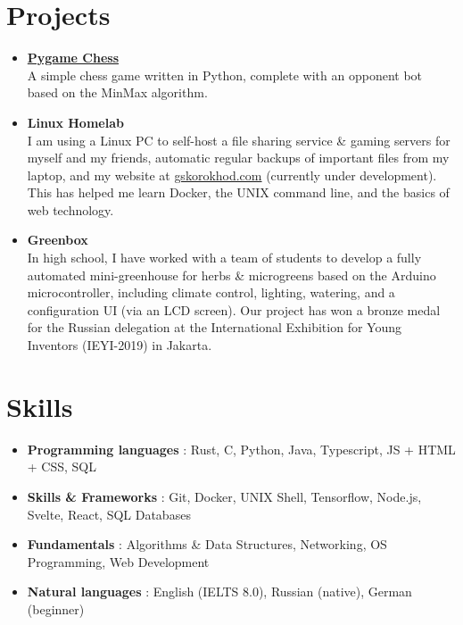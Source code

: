 \documentclass[letterpaper,11pt]{article}
\newcommand{\resumeItem}[2]{
  \item\small{
    \textbf{#1}{ #2 \vspace{-2pt}}
  }
}
\newcommand{\resumeSubItem}[2]{\resumeItem{#1}{#2}\vspace{-4pt}}
\newcommand{\resumeSubHeadingListStart}{\begin{itemize}[leftmargin=*]}
\newcommand{\resumeSubHeadingListEnd}{\end{itemize}}
\begin{document}
\section{Projects}
  \resumeSubHeadingListStart
    \resumeSubItem{\href{https://github.com/gskorokhod/PygameChess}{Pygame Chess} \\}
      {A simple chess game written in Python, complete with an opponent bot based on the MinMax algorithm.}
    \resumeSubItem{Linux Homelab \\}
      {I am using a Linux PC to self-host a file sharing service \& gaming servers for myself and my friends, automatic regular backups of important files from my laptop, and my website at \href{https://gskorokhod.com}{gskorokhod.com} (currently under development).\\ This has helped me learn Docker, the UNIX command line, and the basics of web technology. }
    \resumeSubItem{Greenbox \\}
      {In high school, I have worked with a team of students to develop a fully automated mini-greenhouse for herbs \& microgreens based on the Arduino microcontroller, including climate control, lighting, watering, and a configuration UI (via an LCD screen). Our project has won a bronze medal for the Russian delegation at the International Exhibition for Young Inventors (IEYI-2019) in Jakarta.}
  \resumeSubHeadingListEnd

\section{Skills}
 \resumeSubHeadingListStart
   \resumeSubItem{Programming languages}{: Rust, C, Python, Java, Typescript, JS + HTML + CSS, SQL }
   \resumeSubItem{Skills \& Frameworks}{: Git, Docker, UNIX Shell, Tensorflow, Node.js, Svelte, React, SQL Databases }
   \resumeSubItem{Fundamentals}{: Algorithms \& Data Structures, Networking, OS Programming, Web Development }
   \resumeSubItem{Natural languages}{: English (IELTS 8.0), Russian (native), German (beginner) }
 \resumeSubHeadingListEnd
\end{document}
